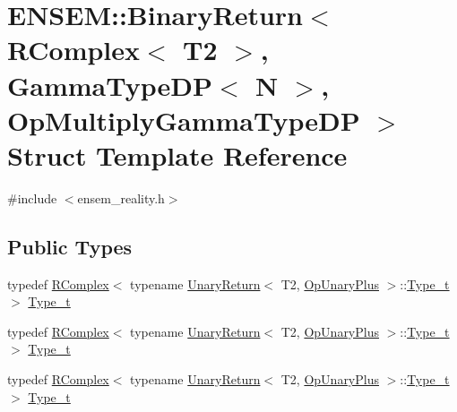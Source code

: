 \hypertarget{structENSEM_1_1BinaryReturn_3_01RComplex_3_01T2_01_4_00_01GammaTypeDP_3_01N_01_4_00_01OpMultiplyGammaTypeDP_01_4}{}\section{E\+N\+S\+EM\+:\+:Binary\+Return$<$ R\+Complex$<$ T2 $>$, Gamma\+Type\+DP$<$ N $>$, Op\+Multiply\+Gamma\+Type\+DP $>$ Struct Template Reference}
\label{structENSEM_1_1BinaryReturn_3_01RComplex_3_01T2_01_4_00_01GammaTypeDP_3_01N_01_4_00_01OpMultiplyGammaTypeDP_01_4}


{\ttfamily \#include $<$ensem\+\_\+reality.\+h$>$}

\subsection*{Public Types}
\begin{DoxyCompactItemize}
\item 
typedef \mbox{\hyperlink{classENSEM_1_1RComplex}{R\+Complex}}$<$ typename \mbox{\hyperlink{structENSEM_1_1UnaryReturn}{Unary\+Return}}$<$ T2, \mbox{\hyperlink{structENSEM_1_1OpUnaryPlus}{Op\+Unary\+Plus}} $>$\+::\mbox{\hyperlink{structENSEM_1_1BinaryReturn_3_01RComplex_3_01T2_01_4_00_01GammaTypeDP_3_01N_01_4_00_01OpMultiplyGammaTypeDP_01_4_a03cefe5b95db43f31b7cad11f704178e}{Type\+\_\+t}} $>$ \mbox{\hyperlink{structENSEM_1_1BinaryReturn_3_01RComplex_3_01T2_01_4_00_01GammaTypeDP_3_01N_01_4_00_01OpMultiplyGammaTypeDP_01_4_a03cefe5b95db43f31b7cad11f704178e}{Type\+\_\+t}}
\item 
typedef \mbox{\hyperlink{classENSEM_1_1RComplex}{R\+Complex}}$<$ typename \mbox{\hyperlink{structENSEM_1_1UnaryReturn}{Unary\+Return}}$<$ T2, \mbox{\hyperlink{structENSEM_1_1OpUnaryPlus}{Op\+Unary\+Plus}} $>$\+::\mbox{\hyperlink{structENSEM_1_1BinaryReturn_3_01RComplex_3_01T2_01_4_00_01GammaTypeDP_3_01N_01_4_00_01OpMultiplyGammaTypeDP_01_4_a03cefe5b95db43f31b7cad11f704178e}{Type\+\_\+t}} $>$ \mbox{\hyperlink{structENSEM_1_1BinaryReturn_3_01RComplex_3_01T2_01_4_00_01GammaTypeDP_3_01N_01_4_00_01OpMultiplyGammaTypeDP_01_4_a03cefe5b95db43f31b7cad11f704178e}{Type\+\_\+t}}
\item 
typedef \mbox{\hyperlink{classENSEM_1_1RComplex}{R\+Complex}}$<$ typename \mbox{\hyperlink{structENSEM_1_1UnaryReturn}{Unary\+Return}}$<$ T2, \mbox{\hyperlink{structENSEM_1_1OpUnaryPlus}{Op\+Unary\+Plus}} $>$\+::\mbox{\hyperlink{structENSEM_1_1BinaryReturn_3_01RComplex_3_01T2_01_4_00_01GammaTypeDP_3_01N_01_4_00_01OpMultiplyGammaTypeDP_01_4_a03cefe5b95db43f31b7cad11f704178e}{Type\+\_\+t}} $>$ \mbox{\hyperlink{structENSEM_1_1BinaryReturn_3_01RComplex_3_01T2_01_4_00_01GammaTypeDP_3_01N_01_4_00_01OpMultiplyGammaTypeDP_01_4_a03cefe5b95db43f31b7cad11f704178e}{Type\+\_\+t}}
\end{DoxyCompactItemize}


